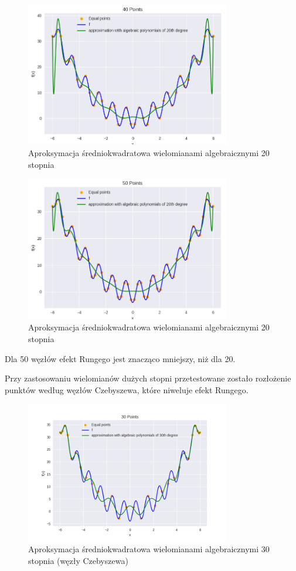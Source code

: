 \documentclass{article}
\begin{document}
\begin{figure}[H]
    \centering
    \includegraphics[width=0.8\textwidth]{img/algpoly_20_40.png}
    \caption{Aproksymacja średniokwadratowa wielomianami algebraicznymi 20 stopnia}
\end{figure}


\begin{figure}[H]
    \centering
    \includegraphics[width=0.8\textwidth]{img/algpoly_20_50.png}
    \caption{Aproksymacja średniokwadratowa wielomianami algebraicznymi 20 stopnia}
\end{figure}

Dla 50 węzłów efekt Rungego jest znacząco mniejszy, niż dla 20.

Przy zastosowaniu wielomianów dużych stopni przetestowane zostało rozłożenie punktów według węzłów Czebyszewa,
które niweluje efekt Rungego.

\begin{figure}[H]
    \centering
    \includegraphics[width=0.8\textwidth]{img/algpoly_30_30.png}
    \caption{Aproksymacja średniokwadratowa wielomianami algebraicznymi 30 stopnia (węzły Czebyszewa)}
\end{figure}
\end{document}
